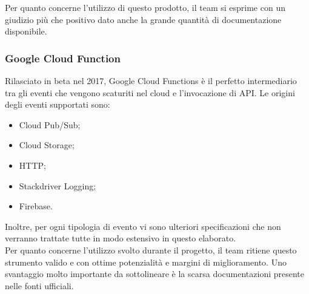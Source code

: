 Per quanto concerne l'utilizzo di questo prodotto, il team si esprime con un giudizio più che positivo dato anche la grande quantità di documentazione disponibile.
\subsubsection{Google Cloud Function}\label{GoogleCloudFunction}
Rilasciato in beta nel 2017, Google Cloud Functions è il perfetto intermediario tra gli eventi che vengono scaturiti nel cloud e l'invocazione di API. Le origini degli eventi supportati sono:
\begin{itemize}
	\item Cloud Pub/Sub;
	\item Cloud Storage;
	\item HTTP;
	\item Stackdriver Logging;
	\item Firebase. 
\end{itemize}
Inoltre, per ogni tipologia di evento vi sono ulteriori specificazioni che non verranno trattate tutte in modo estensivo in questo elaborato.
\\
Per quanto concerne l'utilizzo svolto durante il progetto, il team ritiene questo strumento valido e con ottime potenzialità e margini di miglioramento. Uno svantaggio molto importante da sottolineare è la scarsa documentazioni presente nelle fonti ufficiali.
